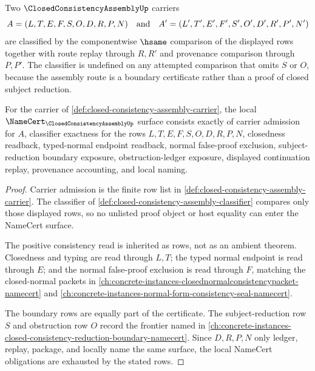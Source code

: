 \begin{definition}
\label{def:closed-consistency-assembly-classifier}
Two $\ClosedConsistencyAssemblyUp$ carriers
$$
A=(L,T,E,F,S,O,D,R,P,N)
\quad\hbox{and}\quad
A'=(L',T',E',F',S',O',D',R',P',N')
$$
are classified by the componentwise $\hsame$ comparison of the displayed rows together with route replay through $R,R'$ and provenance comparison through $P,P'$. The classifier is undefined on any attempted comparison that omits $S$ or $O$, because the assembly route is a boundary certificate rather than a proof of closed subject reduction.
\end{definition}

\begin{theorem}
\label{thm:closed-consistency-assembly-namecert-obligations}
For the carrier of \autoref{def:closed-consistency-assembly-carrier}, the local $\NameCert_{\ClosedConsistencyAssemblyUp}$ surface consists exactly of carrier admission for $A$, classifier exactness for the rows $L,T,E,F,S,O,D,R,P,N$, closedness readback, typed-normal endpoint readback, normal false-proof exclusion, subject-reduction boundary exposure, obstruction-ledger exposure, displayed continuation replay, provenance accounting, and local naming.
\end{theorem}
\begin{proof}
Carrier admission is the finite row list in \autoref{def:closed-consistency-assembly-carrier}. The classifier of \autoref{def:closed-consistency-assembly-classifier} compares only those displayed rows, so no unlisted proof object or host equality can enter the NameCert surface.

The positive consistency read is inherited as rows, not as an ambient theorem. Closedness and typing are read through $L,T$; the typed normal endpoint is read through $E$; and the normal false-proof exclusion is read through $F$, matching the closed-normal packets in \autoref{ch:concrete-instances-closednormalconsistencypacket-namecert} and \autoref{ch:concrete-instances-normal-form-consistency-seal-namecert}.

The boundary rows are equally part of the certificate. The subject-reduction row $S$ and obstruction row $O$ record the frontier named in \autoref{ch:concrete-instances-closed-consistency-reduction-boundary-namecert}. Since $D,R,P,N$ only ledger, replay, package, and locally name the same surface, the local NameCert obligations are exhausted by the stated rows.
\end{proof}

